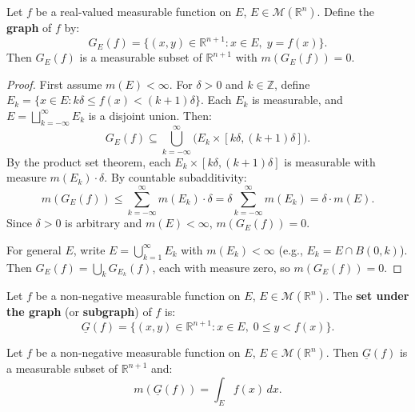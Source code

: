 \documentclass[11pt]{report}
\begin{document}
\begin{corbox}
Let $f$ be a real-valued measurable function on $E$, $E \in \mathcal{M}(\mathbb{R}^n)$. Define the \textbf{graph} of $f$ by:
\[
G_E(f) = \{(x, y) \in \mathbb{R}^{n+1} : x \in E,\; y = f(x)\}.
\]
Then $G_E(f)$ is a measurable subset of $\mathbb{R}^{n+1}$ with $m(G_E(f)) = 0$.
\end{corbox}

\begin{proof}
First assume $m(E) < \infty$. For $\delta > 0$ and $k \in \mathbb{Z}$, define $E_k = \{x \in E : k\delta \leq f(x) < (k+1)\delta\}$. Each $E_k$ is measurable, and $E = \bigsqcup_{k=-\infty}^{\infty} E_k$ is a disjoint union. Then:
\[
G_E(f) \subseteq \bigcup_{k=-\infty}^{\infty} \bigl(E_k \times [k\delta, (k+1)\delta]\bigr).
\]
By the product set theorem, each $E_k \times [k\delta, (k+1)\delta]$ is measurable with measure $m(E_k) \cdot \delta$. By countable subadditivity:
\[
m(G_E(f)) \leq \sum_{k=-\infty}^{\infty} m(E_k) \cdot \delta = \delta \sum_{k=-\infty}^{\infty} m(E_k) = \delta \cdot m(E).
\]
Since $\delta > 0$ is arbitrary and $m(E) < \infty$, $m(G_E(f)) = 0$.

For general $E$, write $E = \bigcup_{k=1}^{\infty} E_k$ with $m(E_k) < \infty$ (e.g., $E_k = E \cap B(0,k)$). Then $G_E(f) = \bigcup_k G_{E_k}(f)$, each with measure zero, so $m(G_E(f)) = 0$.
\end{proof}

\begin{defbox}
Let $f$ be a non-negative measurable function on $E$, $E \in \mathcal{M}(\mathbb{R}^n)$. The \textbf{set under the graph} (or \textbf{subgraph}) of $f$ is:
\[
\underline{G}(f) = \{(x, y) \in \mathbb{R}^{n+1} : x \in E,\; 0 \leq y < f(x)\}.
\]
\end{defbox}

\begin{thmbox}
Let $f$ be a non-negative measurable function on $E$, $E \in \mathcal{M}(\mathbb{R}^n)$. Then $\underline{G}(f)$ is a measurable subset of $\mathbb{R}^{n+1}$ and:
\[
m(\underline{G}(f)) = \int_E f(x)\,dx.
\]
\end{thmbox}
\end{document}
